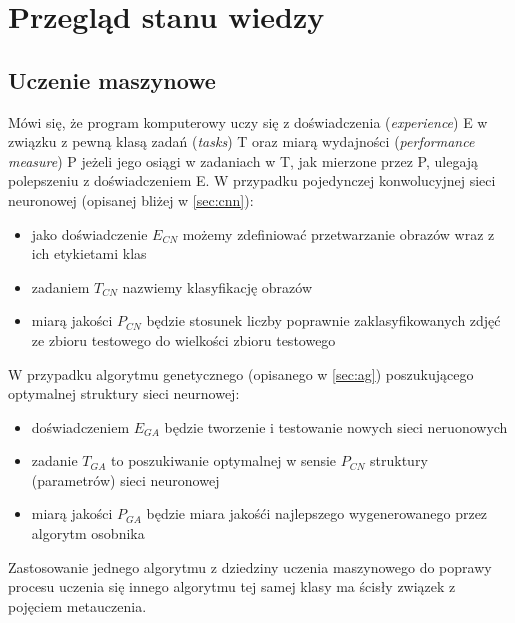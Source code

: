 \chapter{Przegląd stanu wiedzy}\label{chap:teoria}
\section{Uczenie maszynowe}\label{machine_learning}
Mówi się, że program komputerowy uczy się z doświadczenia (\textit{experience}) E w związku z pewną klasą zadań (\textit{tasks}) T oraz miarą wydajności (\textit{performance measure}) P jeżeli jego osiągi w zadaniach w T, jak mierzone przez P, ulegają polepszeniu z doświadczeniem E. \cite{mitchell1997machine}
W przypadku pojedynczej konwolucyjnej sieci neuronowej (opisanej bliżej w \ref{sec:cnn}):
\begin{itemize}
	\item jako doświadczenie $E_{CN}$ możemy zdefiniować przetwarzanie obrazów wraz z ich etykietami klas
	\item zadaniem $T_{CN}$ nazwiemy klasyfikację obrazów
	\item miarą jakości $P_{CN}$ będzie stosunek liczby poprawnie zaklasyfikowanych zdjęć ze zbioru testowego do wielkości zbioru testowego
\end{itemize}
W przypadku algorytmu genetycznego (opisanego w \ref{sec:ag}) poszukującego optymalnej struktury sieci neurnowej:
\begin{itemize}
	\item doświadczeniem $E_{GA}$ będzie tworzenie i testowanie nowych sieci neruonowych
	\item zadanie $T_{GA}$ to poszukiwanie optymalnej w sensie $P_{CN}$ struktury (parametrów) sieci neuronowej
	\item miarą jakości $P_{GA}$ będzie miara jakośći najlepszego wygenerowanego przez algorytm osobnika
\end{itemize}
Zastosowanie jednego algorytmu z dziedziny uczenia maszynowego do poprawy procesu uczenia się innego algorytmu tej samej klasy ma ścisły związek z pojęciem metauczenia.
